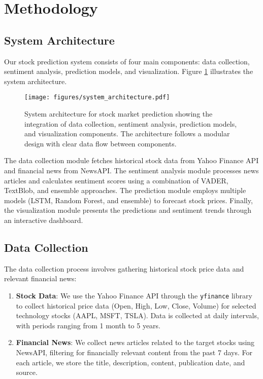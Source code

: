 \documentclass[review]{elsarticle}
\begin{document}
\section{Methodology}
\label{methodology}

\subsection{System Architecture}

Our stock prediction system consists of four main components: data collection, sentiment analysis, prediction models, and visualization. Figure \ref{fig:system-architecture} illustrates the system architecture.

\begin{figure}[h]
\centering
\texttt{[image: figures/system\_architecture.pdf]}
\caption{System architecture for stock market prediction showing the integration of data collection, sentiment analysis, prediction models, and visualization components. The architecture follows a modular design with clear data flow between components.}
\label{fig:system-architecture}
\end{figure}

The data collection module fetches historical stock data from Yahoo Finance API and financial news from NewsAPI. The sentiment analysis module processes news articles and calculates sentiment scores using a combination of VADER, TextBlob, and ensemble approaches. The prediction module employs multiple models (LSTM, Random Forest, and ensemble) to forecast stock prices. Finally, the visualization module presents the predictions and sentiment trends through an interactive dashboard.

\subsection{Data Collection}

The data collection process involves gathering historical stock price data and relevant financial news:

\begin{enumerate}
    \item \textbf{Stock Data}: We use the Yahoo Finance API through the \texttt{yfinance} library to collect historical price data (Open, High, Low, Close, Volume) for selected technology stocks (AAPL, MSFT, TSLA). Data is collected at daily intervals, with periods ranging from 1 month to 5 years.
    
    \item \textbf{Financial News}: We collect news articles related to the target stocks using NewsAPI, filtering for financially relevant content from the past 7 days. For each article, we store the title, description, content, publication date, and source.
\end{enumerate}
\end{document}
